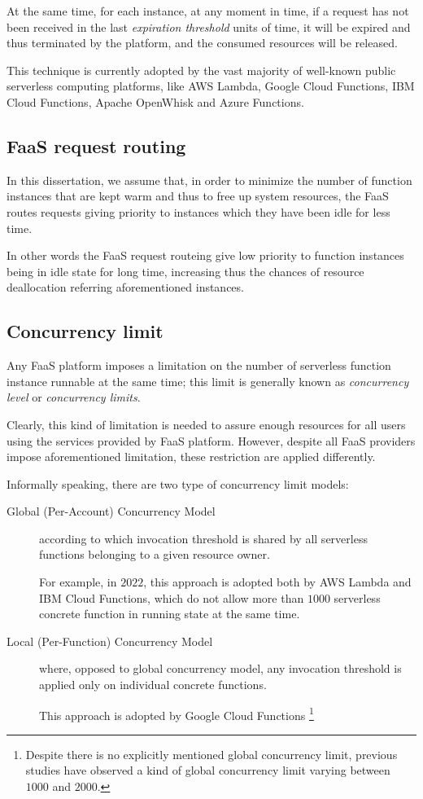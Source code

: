 \documentclass[12pt,a4paper]{report}
\begin{document}
At the same time, for each instance, at any moment in time, if a request has not been received in the last \textit{expiration threshold} units of time, it will be expired and thus terminated by the platform, and the consumed resources will be released. 

This technique is currently adopted by the vast majority of well-known public serverless computing platforms, like AWS Lambda, Google Cloud Functions, IBM Cloud Functions, Apache OpenWhisk and Azure Functions. 

\subsection{FaaS request routing}

In this dissertation, we assume that, in order to minimize the number of
function instances that are kept warm and thus to free up system resources, the FaaS routes requests giving priority to instances which they have been idle for less time.

In other words the FaaS request routeing give low priority to function instances being in idle state for long time, increasing thus the chances of resource deallocation referring aforementioned instances.

\subsection{Concurrency limit}

Any FaaS platform imposes a limitation on the number of serverless function instance runnable at the same time; this limit is generally known as \textit{concurrency level} or \textit{concurrency limits}. 

Clearly, this kind of limitation is needed to assure enough resources for all users using the services provided by FaaS platform. However, despite all FaaS providers impose aforementioned limitation, these restriction are applied differently.

Informally speaking, there are two type of concurrency limit models:

\begin{description}
	\item[Global (Per-Account) Concurrency Model] according to which invocation threshold is shared by all serverless functions belonging to a given resource owner. 
	
	For example, in $2022$, this approach is adopted both by AWS Lambda and IBM Cloud Functions, which do not allow more than $1000$ serverless concrete function in running state at the same time.
	
	\item[Local (Per-Function) Concurrency Model] where, opposed to global concurrency model, any invocation threshold is applied only on individual concrete functions. 
	
	This approach is adopted by Google Cloud Functions \footnote{Despite there is no explicitly mentioned global concurrency limit, previous studies have observed a kind of global concurrency limit varying between $1000$ and $2000$.}
	
\end{description}
\end{document}
